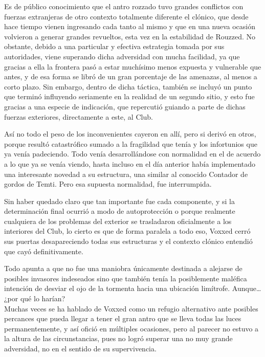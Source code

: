 \documentclass[
  spanish,
]{book}
\begin{document}
Es de público conocimiento que el antro rozzado tuvo grandes conflictos con fuerzas extranjeras de otro contexto totalmente diferente el clónico, que desde hace tiempo vienen ingresando cada tanto al mismo y que en una nueva ocasión volvieron a generar grandes revueltos, esta vez en la estabilidad de Rouzzed. No obstante, debido a una particular y efectiva estrategia tomada por sus autoridades, viene superando dicha adversidad con mucha facilidad, ya que gracias a ella la frontera pasó a estar muchísimo menos expuesta y vulnerable que antes, y de esa forma se libró de un gran porcentaje de las amenazas, al menos a corto plazo. Sin embargo, dentro de dicha táctica, también se incluyó un punto que terminó influyendo seriamente en la realidad de un segundo sitio, y esto fue gracias a una especie de indicación, que repercutió guiando a parte de dichas fuerzas exteriores, directamente a este, al Club.

Así no todo el peso de los inconvenientes cayeron en allí, pero si derivó en otros, porque resultó catastrófico sumado a la fragilidad que tenía y los infortunios que ya venía padeciendo. Todo venía desarrollándose con normalidad en el de acuerdo a lo que ya se venía viendo, hasta incluso en el día anterior había implementado una interesante novedad a su estructura, una similar al conocido Contador de gordos de Temti. Pero esa supuesta normalidad, fue interrumpida.

Sin haber quedado claro que tan importante fue cada componente, y si la determinación final ocurrió a modo de autoprotección o porque realmente cualquiera de los problemas del exterior se trasladaron oficialmente a los interiores del Club, lo cierto es que de forma paralela a todo eso, Voxxed cerró sus puertas desapareciendo todas sus estructuras y el contexto clónico entendió que cayó definitivamente.

Todo apunta a que no fue una maniobra únicamente destinada a alejarse de posibles invasores indeseados sino que también tenía la posiblemente maléfica intención de desviar el ojo de la tormenta hacia una ubicación limítrofe. Aunque\ldots{} ¿por qué lo harían?\\
Muchas veces se ha hablado de Voxxed como un refugio alternativo ante posibles percances que pueda llegar a tener el gran antro que se lleva todas las luces permanentemente, y así ofició en múltiples ocasiones, pero al parecer no estuvo a la altura de las circunstancias, pues no logró superar una no muy grande adversidad, no en el sentido de su supervivencia.
\end{document}

